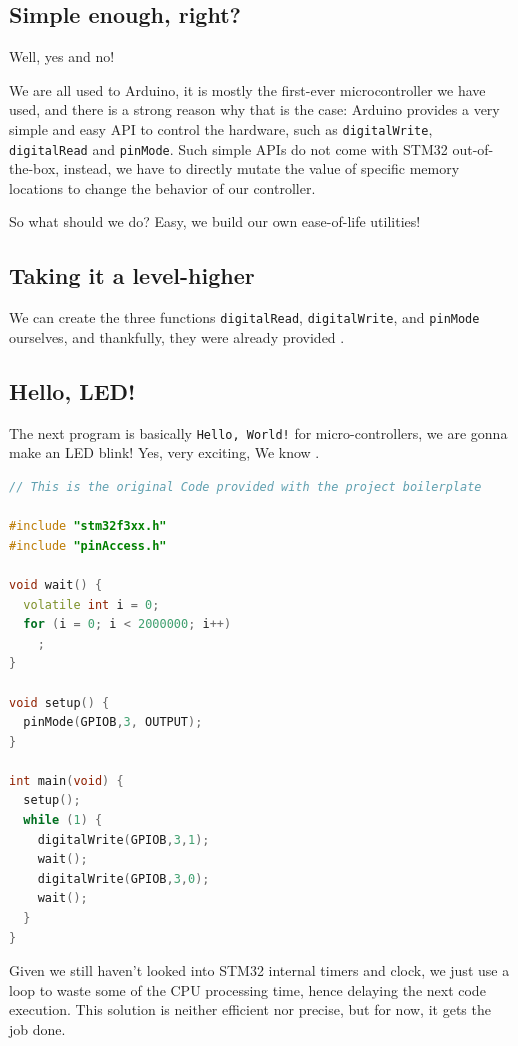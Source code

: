 \documentclass{article}
\begin{document}
\subsection{Simple enough, right?}

Well, yes and no!

We are all used to Arduino, it is mostly the first-ever microcontroller we have used, and there is a strong reason why that is the case: Arduino provides a very simple and easy API to control the hardware, such as \verb|digitalWrite|, \verb|digitalRead| and \verb|pinMode|. Such simple APIs do not come with STM32 out-of-the-box, instead, we have to directly mutate the value of specific memory locations to change the behavior of our controller.

So what should we do? Easy, we build our own ease-of-life utilities!

\subsection{Taking it a level-higher}
We can create the three functions \verb|digitalRead|, \verb|digitalWrite|, and \verb|pinMode| ourselves, and thankfully, they were already provided .

\subsection{Hello, LED!}
The next program is basically \verb|Hello, World!| for micro-controllers, we are gonna make an LED blink! Yes, very exciting, We know .

\begin{lstlisting}[language=C++, caption={Blinking LED}]
// This is the original Code provided with the project boilerplate

#include "stm32f3xx.h"
#include "pinAccess.h"

void wait() {
  volatile int i = 0;
  for (i = 0; i < 2000000; i++)
    ;
}

void setup() {
  pinMode(GPIOB,3, OUTPUT);
}

int main(void) {
  setup();
  while (1) {
    digitalWrite(GPIOB,3,1);
    wait();
    digitalWrite(GPIOB,3,0);
    wait();
  }
}
\end{lstlisting}

Given we still haven't looked into STM32 internal timers and clock, we just use a loop to waste some of the CPU processing time, hence delaying the next code execution. This solution is neither efficient nor precise, but for now, it gets the job done.
\end{document}
